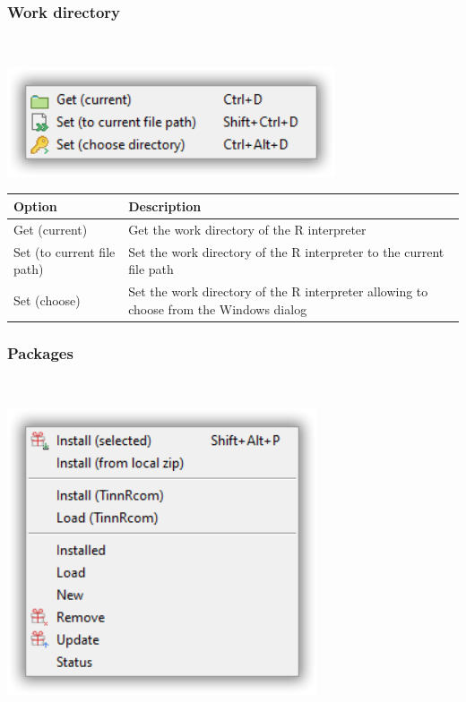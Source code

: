 \newpage
\hypertarget{menu_r_control_workdir}{}
\subsubsection{Work directory}\\

\includegraphics[scale=0.50]{./res/menu_r_control_workdir.png}\\

\begin{scriptsize}
  \begin{tabularx}{\headwidth}{>{\hsize=0.2\hsize}X>{\hsize=0.7\hsize}X}\\
    \hline
    \textbf{Option} & \textbf{Description} \\
    \hline
    Get (current) & Get the work directory of the R interpreter \\
    Set (to current file path) & Set the work directory of the R interpreter to the current file path \\
    Set (choose) & Set the work directory of the R interpreter allowing to choose from the Windows dialog \\
    \hline
  \end{tabularx}
\end{scriptsize}

\hypertarget{menu_r_control_packages}{}
\subsubsection{Packages}\\

\includegraphics[scale=0.50]{./res/menu_r_control_packages.png}\\

